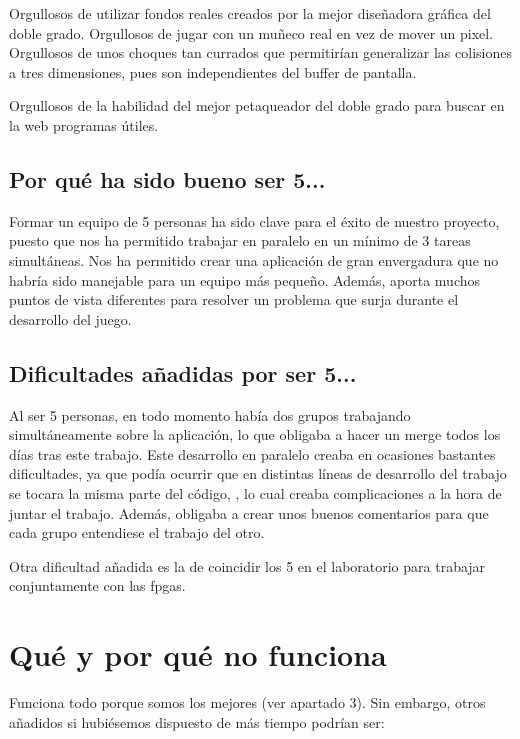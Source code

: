 \documentclass[11pt, a4paper, spanish, openright, twoside]{book}
\begin{document}
Orgullosos de utilizar fondos reales creados por la mejor diseñadora gráfica del doble grado. Orgullosos de jugar con un muñeco real en vez de mover un pixel. Orgullosos de unos choques tan
 currados que permitirían generalizar las colisiones a tres dimensiones, pues son independientes del buffer de pantalla. 

Orgullosos de la habilidad del mejor petaqueador del doble grado para buscar en la web programas útiles. 

\subsection{Por qué ha sido bueno ser 5...}
Formar un equipo de 5 personas ha sido clave para el éxito de nuestro proyecto, puesto que nos ha permitido trabajar en paralelo en un mínimo de 3 tareas simultáneas. Nos ha 
permitido crear una aplicación de gran envergadura que no habría sido manejable para un equipo más pequeño.
Además, aporta muchos puntos de vista diferentes para resolver un problema que surja durante el desarrollo del juego.


\subsection{Dificultades añadidas por ser 5...}

Al ser 5 personas, en todo momento había dos grupos trabajando simultáneamente sobre la aplicación, lo que obligaba a hacer un merge todos los días tras este trabajo. Este desarrollo en paralelo
creaba en ocasiones bastantes dificultades, ya que podía ocurrir que en distintas líneas de desarrollo del trabajo se tocara la misma parte del código, 
, lo cual creaba complicaciones a la hora de juntar el trabajo. Además, 
obligaba a crear unos buenos comentarios para que cada grupo entendiese el trabajo del otro. 

Otra dificultad añadida es la de coincidir los 5  en el laboratorio para trabajar conjuntamente con las fpgas.

\section{Qué y por qué no funciona}
Funciona todo porque somos los mejores (ver apartado 3). Sin embargo, otros añadidos si hubiésemos dispuesto de más tiempo podrían ser:
	
\end{document}
